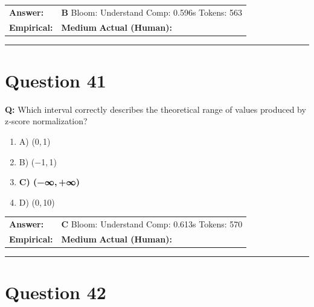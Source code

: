 \documentclass[9pt]{article}
\begin{document}
\begin{tabular}{@{}l p{10.5cm}@{}}
\textbf{Answer:} & \textbf{B} \hspace{1em} Bloom: Understand \hspace{1em} Comp: 0.596s \hspace{1em} Tokens: 563 \\
\textbf{Empirical:} & \textbf{Medium} \hspace{1em} \textbf{Actual (Human):} \underline{\hspace{5cm}}
\end{tabular}

\vspace{0.2cm}
\rule{\textwidth}{0.4pt}
\vspace{0.2cm}


\section*{Question 41}

\textbf{Q:} Which interval correctly describes the theoretical range of values produced by z‑score normalization?

\begin{enumerate}[label=\textbf{\alph{*})}, nosep]
    \item A) (0, 1)
    \item B) (−1, 1)
    \item \textbf{C) (−∞, +∞)} %
    \item D) (0, 10)

\end{enumerate}

\begin{tabular}{@{}l p{10.5cm}@{}}
\textbf{Answer:} & \textbf{C} \hspace{1em} Bloom: Understand \hspace{1em} Comp: 0.613s \hspace{1em} Tokens: 570 \\
\textbf{Empirical:} & \textbf{Medium} \hspace{1em} \textbf{Actual (Human):} \underline{\hspace{5cm}}
\end{tabular}

\vspace{0.2cm}
\rule{\textwidth}{0.4pt}
\vspace{0.2cm}


\section*{Question 42}
\end{document}
